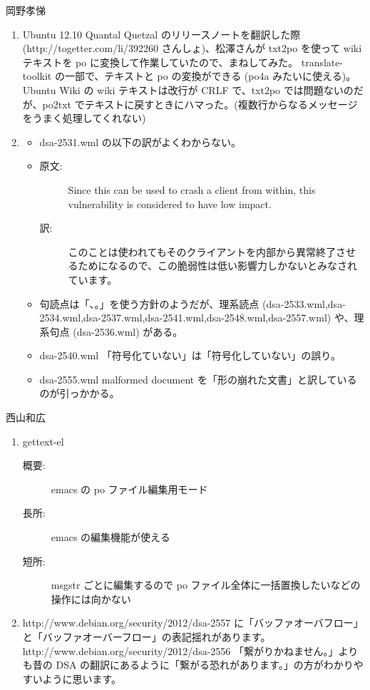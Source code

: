 \documentclass[mingoth,a4paper]{jsarticle}
\begin{document}
\begin{prework}{ 岡野孝悌 }

\begin{enumerate}
\item Ubuntu 12.10 Quantal Quetzal のリリースノートを翻訳した際(http://togetter.com/li/392260 さんしょ)、松澤さんが txt2po を使って wiki テキストを po に変換して作業していたので、まねしてみた。
translate-toolkit の一部で、テキストと po の変換ができる (po4a みたいに使える)。
Ubuntu Wiki の wiki テキストは改行が CRLF で、txt2po では問題ないのだが、po2txt でテキストに戻すときにハマった。(複数行からなるメッセージをうまく処理してくれない)

\item
  \begin{itemize}
    \item dsa-2531.wml の以下の訳がよくわからない。
    \item
      \begin{description}
        \item [原文:] Since this can be used to crash a client from within, this vulnerability is considered to have low impact.
        \item [訳:] このことは使われてもそのクライアントを内部から異常終了させるためになるので、この脆弱性は低い影響力しかないとみなされています。
      \end{description}
    \item 句読点は「、。」を使う方針のようだが、理系読点 (dsa-2533.wml,dsa-2534.wml,dsa-2537.wml,dsa-2541.wml,dsa-2548.wml,dsa-2557.wml) や、理系句点 (dsa-2536.wml) がある。
    \item dsa-2540.wml 「符号化ていない」は「符号化していない」の誤り。
    \item dsa-2555.wml malformed document を「形の崩れた文書」と訳しているのが引っかかる。
  \end{itemize}
\end{enumerate}

\end{prework}

\begin{prework}{ 西山和広 }

\begin{enumerate}
\item gettext-el
\begin{description}
\item [概要:] emacs の po ファイル編集用モード
\item [長所:] emacs の編集機能が使える
\item [短所:] msgstr ごとに編集するので po ファイル全体に一括置換したいなどの操作には向かない
\end{description}

\item http://www.debian.org/security/2012/dsa-2557 に「バッファオーバフロー」と「バッファオーバーフロー」の表記揺れがあります。
http://www.debian.org/security/2012/dsa-2556
「繋がりかねません。」よりも昔の DSA の翻訳にあるように「繋がる恐れがあります。」の方がわかりやすいように思います。
\end{enumerate}

\end{prework}
\end{document}
